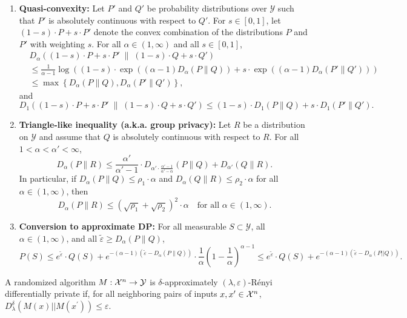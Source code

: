 \documentclass[10pt]{article}
\begin{document}
\begin{ginzabox}[Properties]
\begin{enumerate}
     \item \textbf{Quasi-convexity:} Let $P'$ and $Q'$ be probability distributions over $\mathcal{Y}$ such that $P'$ is absolutely continuous with respect to $Q'$. For $s \in [0, 1]$, let $(1 - s) \cdot P + s \cdot P'$ denote the convex combination of the distributions $P$ and $P'$ with weighting $s$. For all $\alpha \in (1, \infty)$ and all $s \in [0, 1]$,
    \begin{align*}
        & D_\alpha \left( (1 - s) \cdot P + s \cdot P' \;\middle\|\; (1 - s) \cdot Q + s \cdot Q' \right)
        \\
        &\leq \frac{1}{\alpha - 1} \log \left( (1 - s) \cdot \exp \left( (\alpha - 1) D_\alpha(P \| Q) \right) + s \cdot \exp \left( (\alpha - 1) D_\alpha(P' \| Q') \right) \right) \\
        &\leq \max \left\{ D_\alpha(P \| Q), D_\alpha(P' \| Q') \right\},
    \end{align*}
    and
    \[
        D_1 \left( (1 - s) \cdot P + s \cdot P' \;\middle\|\; (1 - s) \cdot Q + s \cdot Q' \right)
        \leq (1 - s) \cdot D_1(P \| Q) + s \cdot D_1(P' \| Q').
    \]

    \item \textbf{Triangle-like inequality (a.k.a. group privacy):} Let $R$ be a distribution on $\mathcal{Y}$ and assume that $Q$ is absolutely continuous with respect to $R$. For all $1 < \alpha < \alpha' < \infty$,
    \[
        D_\alpha(P \| R) \leq \frac{\alpha'}{\alpha' - 1} \cdot D_{\alpha' \cdot \frac{\alpha' - 1}{\alpha' - \alpha}}(P \| Q) + D_{\alpha'}(Q \| R).
    \]
    In particular, if $D_\alpha(P \| Q) \leq \rho_1 \cdot \alpha$ and $D_\alpha(Q \| R) \leq \rho_2 \cdot \alpha$ for all $\alpha \in (1, \infty)$, then
    \[
        D_\alpha(P \| R) \leq \left( \sqrt{\rho_1} + \sqrt{\rho_2} \right)^2 \cdot \alpha \quad \text{for all } \alpha \in (1, \infty).
    \]

    \item \textbf{Conversion to approximate DP:} For all measurable $S \subset \mathcal{Y}$, all $\alpha \in (1, \infty)$, and all $\tilde{\varepsilon} \geq D_\alpha(P \| Q)$,
    \[
        P(S) \leq e^{\tilde{\varepsilon}} \cdot Q(S) + e^{-(\alpha - 1)(\tilde{\varepsilon} - D_\alpha(P \| Q))} \cdot \frac{1}{\alpha} \left(1 - \frac{1}{\alpha} \right)^{\alpha - 1}
        \leq e^{\tilde{\varepsilon}} \cdot Q(S) + e^{-(\alpha-1) (\tilde{\varepsilon}- D_{\alpha} (P ||Q))}.
    \]
\end{enumerate}   
\end{ginzabox}
 A randomized algorithm $M: \mathcal{X}^n \to \mathcal{Y}$ is $\delta$-approximately $(\lambda, \varepsilon)$-Rényi differentially private if, for all neighboring pairs of inputs $x,x^{\prime} \in \mathcal{X}^n$, $D_{\lambda}^{\delta} (M(x) || M(x^{\prime})) \leq \varepsilon$.
\end{document}
